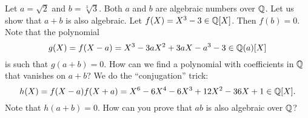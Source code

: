 \begin{example}
\label{exa:two_algebraics}
    Let $a=\sqrt{2}$ and $b=\sqrt[3]{3}$. Both $a$ and $b$ are algebraic numbers over $\mathbb{Q}$. 
    Let us show that $a+b$ is also algebraic. Let $f(X)=X^3-3\in\mathbb{Q}[X]$. Then $f(b)=0$. Note
    that the polynomial 
    \[
    g(X)=f(X-a)=X^3-3aX^2+3aX-a^3-3\in\mathbb{Q}(a)[X]
    \]
    is such that $g(a+b)=0$. How can we find a polynomial 
    with coefficients in $\mathbb{Q}$ that vanishes on $a+b$? We do the ``conjugation'' trick:
    \[
    h(X)=f(X-a)f(X+a)=X^6-6X^4-6X^3+12X^2-36X+1\in\mathbb{Q}[X].
    \]
    Note that $h(a+b)=0$. How can you prove that $ab$ is also algebraic over $\mathbb{Q}$?     
\end{example}
